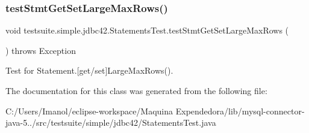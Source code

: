 \subsubsection{\texorpdfstring{test\+Stmt\+Get\+Set\+Large\+Max\+Rows()}{testStmtGetSetLargeMaxRows()}}
{\footnotesize\ttfamily void testsuite.\+simple.\+jdbc42.\+Statements\+Test.\+test\+Stmt\+Get\+Set\+Large\+Max\+Rows (\begin{DoxyParamCaption}{ }\end{DoxyParamCaption}) throws Exception}

Test for Statement.\mbox{[}get/set\mbox{]}Large\+Max\+Rows(). 

The documentation for this class was generated from the following file\+:\begin{DoxyCompactItemize}
\item 
C\+:/\+Users/\+Imanol/eclipse-\/workspace/\+Maquina Expendedora/lib/mysql-\/connector-\/java-\/5../src/testsuite/simple/jdbc42/Statements\+Test.\+java\end{DoxyCompactItemize}
